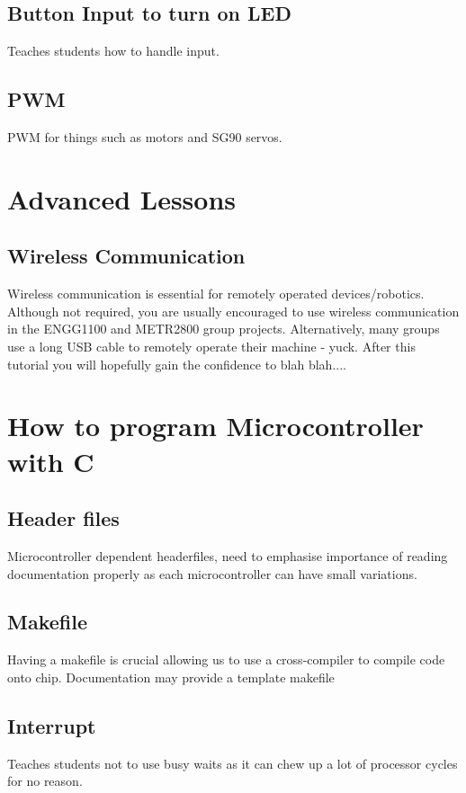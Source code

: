 \documentclass[a4paper,12pt]{report}
\begin{document}
\subsection*{Button Input to turn on LED}
Teaches students how to handle input.
\subsection*{PWM}
PWM for things such as motors and SG90 servos.


\section*{Advanced Lessons}

\subsection*{Wireless Communication}
Wireless communication is essential for remotely operated devices/robotics. 
Although not required, you are usually encouraged to use wireless 
communication in the ENGG1100 and METR2800 group projects.
Alternatively, many groups use a long USB cable to remotely operate their 
machine - yuck. After this tutorial you will hopefully gain the confidence to blah blah....

\section*{How to program Microcontroller with C}
\subsection*{Header files}
Microcontroller dependent headerfiles, need to emphasise importance of reading documentation properly
as each microcontroller can have small variations.
\subsection*{Makefile}
Having a makefile is crucial allowing us to use a cross-compiler to compile code onto chip.
Documentation may provide a template makefile

\subsection*{Interrupt}
Teaches students not to use busy waits as it can chew up a lot of processor cycles for no reason.
\end{document}
